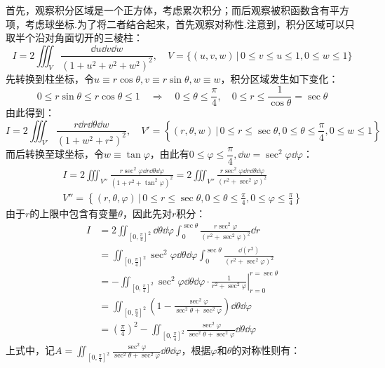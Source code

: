 \begin{solution}
    首先，观察积分区域是一个正方体，考虑累次积分；而后观察被积函数含有平方项，考虑球坐标.为了将二者结合起来，首先观察对称性.注意到，积分区域可以只取半个沿对角面切开的三棱柱：
    \[I = 2\iiint_V\frac{\dd{u}\dd{v}\dd{w}}{(1+u^2+v^2+w^2)^2},\quad V = \{(u,v,w)\,|\, 0\leqslant v \leqslant u \leqslant 1, 0\leqslant w \leqslant 1\}\]
    先转换到柱坐标，令$u\equiv r\cos\theta, v\equiv r\sin\theta, w\equiv w$，积分区域发生如下变化：
    \[0\leqslant r\sin\theta \leqslant r\cos\theta \leqslant 1 \quad\Rightarrow\quad 0 \leqslant \theta \leqslant \frac{\pi}{4},\quad 0\leqslant r \leqslant \frac{1}{\cos\theta} = \sec\theta\]
    由此得到：
    \[I = 2\iiint_{V'}\!\frac{r \dd{r}\dd{\theta}\dd{w}}{(1+w^2+r^2)^2},\quad V' = \left\{(r,\theta,w)\,\Big|\, 0\leqslant r \leqslant \sec\theta, 0\leqslant\theta\leqslant\frac{\pi}{4},0\leqslant w \leqslant 1\right\}\]
    而后转换至球坐标，令$w \equiv \tan\varphi$，由此有$0\leqslant\varphi\leqslant\dfrac{\pi}{4},\dd{w} = \sec^2\varphi\dd{\varphi}$：
    \begin{gather*}
        I = 2\iiint_{V''}\frac{r\sec^2\varphi\dd{r}\dd{\theta}\dd{\varphi}}{(1+r^2+\tan^2\varphi)^2} = 2\iiint_{V''}\frac{r\sec^2\varphi\dd{r}\dd{\theta}\dd{\varphi}}{(r^2+\sec^2\varphi)^2} \\
        V'' = \left\{(r,\theta,\varphi)\,\Big|\,0\leqslant r \leqslant\sec\theta,0\leqslant\theta\leqslant\frac{\pi}{4},0\leqslant\varphi\leqslant\frac{\pi}{4}\right\}
    \end{gather*}
    由于$r$的上限中包含有变量$\theta$，因此先对$r$积分：
    \begin{align*}
        I &= 2\iint_{[0,\frac{\pi}{4}]^2}\dd{\theta}\dd{\varphi}\int_{0}^{\sec\theta}\frac{r\sec^2\varphi}{(r^2+\sec^2\varphi)^2}\dd{r} \\
        &= \iint_{[0,\frac{\pi}{4}]^2}\sec^2\varphi\dd{\theta}\dd{\varphi}\int_{0}^{\sec\theta}\frac{\dd{(r^2)}}{(r^2+\sec^2\varphi)^2} \\
        &= - \iint_{[0,\frac{\pi}{4}]^2}\sec^2\varphi\dd{\theta}\dd{\varphi} \cdot \left.\frac{1}{r^2+\sec^2\varphi}\right|_{r=0}^{r=\sec\theta} \\
        &= \iint_{[0,\frac{\pi}{4}]^2}\left(1-\frac{\sec^2\varphi}{\sec^2\theta+\sec^2\varphi}\right)\dd{\theta}\dd{\varphi} \\
        &= \left(\frac{\pi}{4}\right)^2 - \iint_{[0,\frac{\pi}{4}]^2}\frac{\sec^2\varphi}{\sec^2\theta+\sec^2\varphi}\dd{\theta}\dd{\varphi}
    \end{align*}
    上式中，记$\displaystyle A = \iint_{[0,\frac{\pi}{4}]^2}\frac{\sec^2\varphi}{\sec^2\theta+\sec^2\varphi}\dd{\theta}\dd{\varphi}$，根据$\varphi$和$\theta$的对称性则有：

\end{solution}
